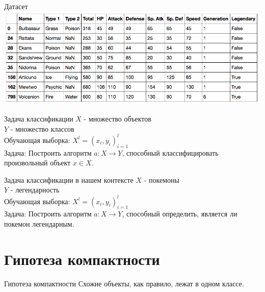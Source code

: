 \documentclass[10pt]{beamer}
\begin{document}
\begin{frame}{Датасет}
    \centering
	\includegraphics[width=\textwidth]{images/pokemons-legendary}
\end{frame}

\begin{frame}{Задача классификации}
	$X$ - множество объектов \\
	$Y$ - множество классов \\
	Обучающая выборка: ${X^l = (x_i, y_i)_{i=1}^l}$ \\ 
	\bigbreak
	\bigbreak
	\alert{Задача}: Построить алгоритм ${a \colon X \rightarrow Y}$, способный классифицировать произвольный объект ${x \in X}$.
\end{frame}

\begin{frame}{Задача классификации в нашем контексте}
	$X$ - покемоны \\
	$Y$ - легендарность \\
	Обучающая выборка: ${X^l = (x_i, y_i)_{i=1}^l}$ \\ 
	\bigbreak
	\alert{Задача}: Построить алгоритм ${a \colon X \rightarrow Y}$, способный определить, является ли покемон легендарным.
\end{frame}

\section{Гипотеза компактности}

\begin{frame}{Гипотеза компактности}
  \centering
	Схожие объекты, как правило, лежат в одном классе.\\
	\bigbreak
\end{frame}
\end{document}
